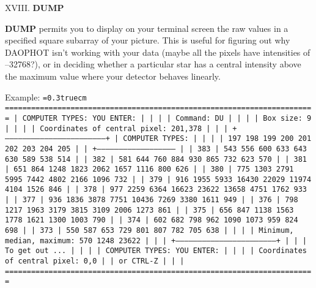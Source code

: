 \vfill
\eject
\noindent XVIII.  {\bf DUMP}

{\bf DUMP} permits you to display on your terminal screen the raw
values in a specified square subarray of your picture.  This is useful
for figuring out why DAOPHOT isn't working with your data (maybe all
the pixels have intensities of --32768?), or in deciding whether a
particular star has a central intensity above the maximum value where
your detector behaves linearly. 

\bigskip
\noindent Example:
\bigskip
{\noindent\obeylines\obeyspaces\frenchspacing\tt\baselineskip=0.3truecm
=======================================================================
| COMPUTER TYPES:                                  YOU ENTER:         |
|                                                                     |
| Command:                                         DU                 |
|                                                                     |
|                                   Box size:      9                  |
|                                                                     |
|               Coordinates of central pixel:      201,378            |
|                                                                     |
+---------------------------------------------------------------------+
| COMPUTER TYPES:                                                     |
|                                                                     |
|               197   198   199   200   201   202   203   204   205   |
|           +------------------------------------------------------   |
|       383 |   543   556   600   633   643   630   589   538   514   |
|       382 |   581   644   760   884   930   865   732   623   570   |
|       381 |   651   864  1248  1823  2062  1657  1116   800   626   |
|       380 |   775  1303  2791  5995  7442  4802  2166  1096   732   |
|       379 |   916  1955  5933 16430 22029 11974  4104  1526   846   |
|       378 |   977  2259  6364 16623 23622 13658  4751  1762   933   |
|       377 |   936  1836  3878  7751 10436  7269  3380  1611   949   |
|       376 |   798  1217  1963  3179  3815  3109  2006  1273   861   |
|       375 |   656   847  1138  1563  1778  1621  1300  1003   790   |
|       374 |   602   682   798   962  1090  1073   959   824   698   |
|       373 |   550   587   653   729   801   807   782   705   638   |
|                                                                     |
|                   Minimum, median, maximum:    570   1248  23622    |
|                                                                     |
+---------------------------------------------------------------------+
|                                                                     |
| To get out ...                                                      |
|                                                                     |
| COMPUTER TYPES:                                      YOU ENTER:     |
|                                                                     |
|               Coordinates of central pixel:          0,0            |
|                                                   or CTRL-Z         |
|                                                                     |
=======================================================================
}
\bigskip

